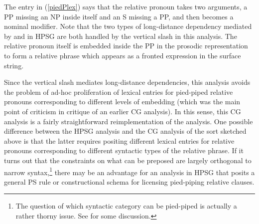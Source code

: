 \documentclass[output=paper
                ,modfonts
 	        ,biblatex
                ,babelshorthands
                ,newtxmath
                ,draftmode
                ,colorlinks, citecolor=brown
]{langscibook}
\begin{document}
\begin{exe}
 \ex\label{piedPlex}
  \oneline{\LexEnt{\pt{\ensuremath{\lambda} \ensuremath{\greeks_1} \ensuremath{\lambda} \ensuremath{\greeks_2}. \ensuremath{\greeks_1}(whom) \ensuremath{\circ}\xspace \ensuremath{\greeks_2}(\E)}}{\sem{ \lambda F \lambda P \lambda Q \lambda x. P(F(x)) \ensuremath{ \wedge\xspace } Q(x)}}{\syncat{(N\ensuremath{\backslash}{}N)\vs (S\vs PP)\vs (PP\vs NP)}}}
\end{exe}
The entry in (\ref{piedPlex}) says that the relative pronoun takes two
arguments, a PP missing an NP inside itself and an S missing a PP, and
then becomes a nominal modifier. Note that the two types of
long-distance dependency mediated by \REL and \SLASH in HPSG are both handled
by the vertical slash in this analysis. The relative pronoun itself is
embedded inside the PP in the prosodic representation to form a relative phrase
which appears as a fronted expression in the surface string.

Since the vertical slash mediates long-distance dependencies, this
analysis avoids the problem of ad-hoc proliferation of lexical entries 
for pied-piped relative pronouns corresponding to different levels of
embedding (which was the main point of criticism in
 critique of an earlier CG analysis). In this
sense, this CG analysis is a fairly straightforward reimplementation
of the \citet{ps2} analysis. One possible difference between
the HPSG analysis 
and the CG analysis of the sort sketched above is that the latter
requires positing different lexical entries for relative pronouns
corresponding to different syntactic types of the relative phrase. If
it turns out that the constraints on what can be preposed are largely
orthogonal to narrow syntax,\footnote{The question of which syntactic
category can be pied-piped is actually a rather thorny issue. See
 for some
discussion.} there may be an advantage for an analysis in HPSG that
posits a general PS rule or constructional schema for licensing pied-piping
relative clauses.\label{cg:page-pied-piping-end}


\end{document}
